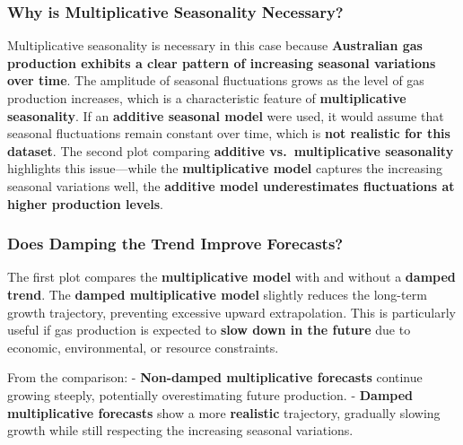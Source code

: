 \documentclass[
]{article}
\begin{document}
\hypertarget{why-is-multiplicative-seasonality-necessary}{%
\subsubsection{\texorpdfstring{\textbf{Why is Multiplicative Seasonality
Necessary?}}{Why is Multiplicative Seasonality Necessary?}}\label{why-is-multiplicative-seasonality-necessary}}

Multiplicative seasonality is necessary in this case because
\textbf{Australian gas production exhibits a clear pattern of increasing
seasonal variations over time}. The amplitude of seasonal fluctuations
grows as the level of gas production increases, which is a
characteristic feature of \textbf{multiplicative seasonality}. If an
\textbf{additive seasonal model} were used, it would assume that
seasonal fluctuations remain constant over time, which is \textbf{not
realistic for this dataset}. The second plot comparing \textbf{additive
vs.~multiplicative seasonality} highlights this issue---while the
\textbf{multiplicative model} captures the increasing seasonal
variations well, the \textbf{additive model underestimates fluctuations
at higher production levels}.

\hypertarget{does-damping-the-trend-improve-forecasts}{%
\subsubsection{\texorpdfstring{\textbf{Does Damping the Trend Improve
Forecasts?}}{Does Damping the Trend Improve Forecasts?}}\label{does-damping-the-trend-improve-forecasts}}

The first plot compares the \textbf{multiplicative model} with and
without a \textbf{damped trend}. The \textbf{damped multiplicative
model} slightly reduces the long-term growth trajectory, preventing
excessive upward extrapolation. This is particularly useful if gas
production is expected to \textbf{slow down in the future} due to
economic, environmental, or resource constraints.

From the comparison: - \textbf{Non-damped multiplicative forecasts}
continue growing steeply, potentially overestimating future production.
- \textbf{Damped multiplicative forecasts} show a more
\textbf{realistic} trajectory, gradually slowing growth while still
respecting the increasing seasonal variations.
\end{document}
